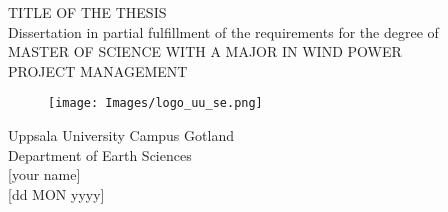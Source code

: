 
\thispagestyle{empty}

\vspace*{+5em}
\begin{center}
TITLE OF THE THESIS\\
\vspace*{+8em}
Dissertation in partial fulfillment of the requirements for the degree of\\
\vspace{+2em}
MASTER OF SCIENCE WITH A MAJOR IN WIND POWER\\
PROJECT MANAGEMENT\\

\vspace*{+3em}
\begin{figure}[H]
\centering
\texttt{[image: Images/logo\_uu\_se.png]}
\end{figure}

\vspace*{+3em}
Uppsala University Campus Gotland\\
Department of Earth Sciences\\
\vspace*{+2em}
[your name]\\

\vspace*{+12em}
[dd MON yyyy]

\end{center}